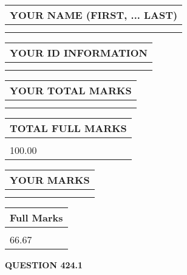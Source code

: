 \documentclass{ctexart}
\begin{document}
   
   
   
\newpage 
\setcounter{page}{ 
   424001 } 
   
   
   
   
\noindent\begin{tabular}{|l|}
\hline
YOUR NAME (FIRST, ... LAST)  \\
\hline
 \\ 
 \\ 
\hline
\end{tabular}
\hspace{0.05in} \begin{tabular}{|l|}
\hline
 YOUR   ID   INFORMATION  \\
\hline
 \\ 
 \\ 
\hline
\end{tabular}
   
   
\vspace{0.2in}\noindent\begin{tabular}{|l|}
\hline
YOUR TOTAL MARKS  \\
\hline
 \\ 
 \\ 
\hline
\end{tabular}
\hspace{0.05in} \begin{tabular}{|l|}
\hline
TOTAL FULL MARKS  \\
\hline
 \\ 
100.00 \\
\hline
\end{tabular}
   
   
 \vspace{0.2in}
 
 
 
 
   
   
  
\vspace{0.2in}
  
\noindent\begin{tabular}{|l|}
\hline
 YOUR MARKS  \\
\hline
 \\ 
 \\ 
\hline
\end{tabular}
\hspace{0.05in} \begin{tabular}{|l|}
\hline
 Full Marks  \\
\hline
 \\ 
66.67 \\
\hline
\end{tabular}
{\textbf{\Large{QUESTION
424.1 
}}}
  
\end{document}
